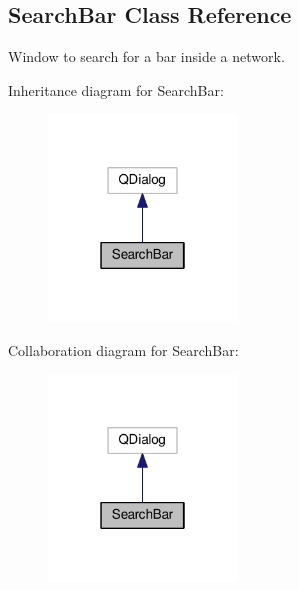 \hypertarget{class_search_bar}{}\subsection{Search\+Bar Class Reference}
\label{class_search_bar}


Window to search for a bar inside a network.  




Inheritance diagram for Search\+Bar\+:
\nopagebreak
\begin{figure}[H]
\begin{center}
\leavevmode
\includegraphics[width=142pt]{class_search_bar__inherit__graph}
\end{center}
\end{figure}


Collaboration diagram for Search\+Bar\+:
\nopagebreak
\begin{figure}[H]
\begin{center}
\leavevmode
\includegraphics[width=142pt]{class_search_bar__coll__graph}
\end{center}
\end{figure}
